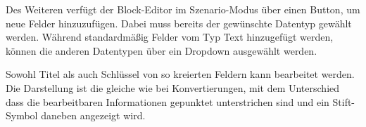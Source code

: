 Des Weiteren verfügt der Block-Editor im Szenario-Modus über einen Button, um neue Felder hinzuzufügen. Dabei muss bereits der gewünschte Datentyp gewählt werden. Während standardmäßig Felder vom Typ Text hinzugefügt werden, können die anderen Datentypen über ein Dropdown ausgewählt werden.

Sowohl Titel als auch Schlüssel von so kreierten Feldern kann bearbeitet werden. Die Darstellung ist die gleiche wie bei Konvertierungen, mit dem Unterschied dass die bearbeitbaren Informationen gepunktet unterstrichen sind und ein Stift-Symbol daneben angezeigt wird.
